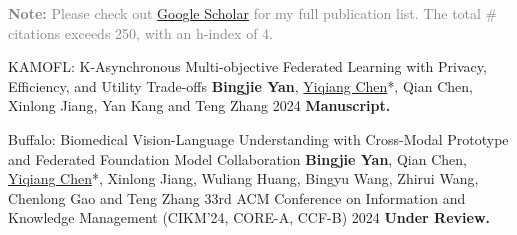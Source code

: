 

\begin{cvparagraph}
\textcolor{gray}{\textbf{Note:} Please check out \href{https://scholar.google.com/citations?hl=en&user=DVsgN1sAAAAJ}{Google Scholar} for my full publication list.
The total \# citations exceeds 250, with an h-index of 4.}
\end{cvparagraph}
\vspace{-1.0mm}
\begin{cvpublications}

\cvpublication
{KAMOFL: K-Asynchronous Multi-objective Federated Learning with Privacy, Efficiency, and Utility Trade-offs} %
{\textbf{Bingjie Yan}, \underline{Yiqiang Chen}*, Qian Chen, Xinlong Jiang, Yan Kang and Teng Zhang} %
{} %
{2024} %
{\textbf{Manuscript.}} %

\cvpublication
{Buffalo: Biomedical Vision-Language Understanding with Cross-Modal Prototype and Federated Foundation Model Collaboration} %
{\textbf{Bingjie Yan}, Qian Chen, \underline{Yiqiang Chen}*, Xinlong Jiang, Wuliang Huang, Bingyu Wang, Zhirui Wang, Chenlong Gao and Teng Zhang} %
{33rd ACM Conference on Information and Knowledge Management (CIKM'24, CORE-A, CCF-B)} %
{2024} %
{\textbf{Under Review.}} %



\end{cvpublications}

